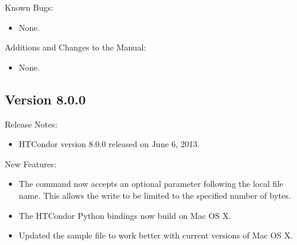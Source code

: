 \noindent Known Bugs:

\begin{itemize}

\item None.

\end{itemize}

\noindent Additions and Changes to the Manual:

\begin{itemize}

\item None.

\end{itemize}


\subsection*{\label{sec:New-8-0-0}Version 8.0.0}

\noindent Release Notes:

\begin{itemize}

\item HTCondor version 8.0.0 released on June 6, 2013.

\end{itemize}


\noindent New Features:

\begin{itemize}

\item The   command now accepts an 
optional  parameter following the local file name.
This allows the write to be limited to the specified number of bytes.

\item The HTCondor Python bindings now build on Mac OS X.

\item Updated the sample  file to work better with
current versions of Mac OS X.

\end{itemize}

